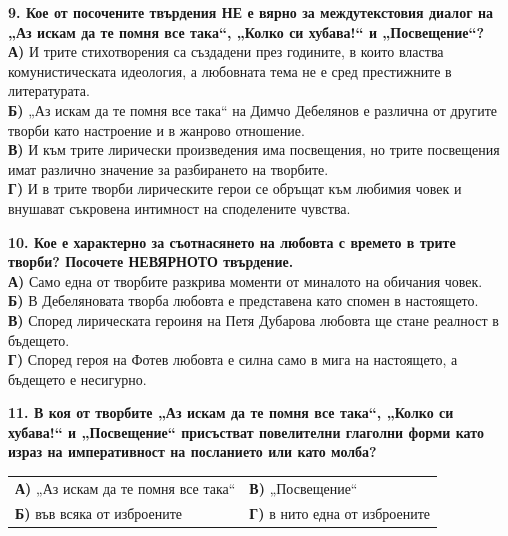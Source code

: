 \documentclass[12pt,a4paper]{article}
\begin{document}
\noindent
\textbf{9. Кое от посочените твърдения \textbf{НЕ} е вярно за междутекстовия диалог на „Аз искам да те помня все така“, „Колко си хубава!“ и „Посвещение“?} \\
\textbf{А)} И трите стихотворения са създадени през годините, в които властва комунистическата идеология, а любовната тема не е сред престижните в литературата. \\
\textbf{Б)} „Аз искам да те помня все така“ на Димчо Дебелянов е различна от другите творби като настроение и в жанрово отношение. \\
\textbf{В)} И към трите лирически произведения има посвещения, но трите посвещения имат различно значение за разбирането на творбите. \\
\textbf{Г)} И в трите творби лирическите герои се обръщат към любимия човек и внушават съкровена интимност на споделените чувства.

\vspace{0.6cm}

\noindent
\textbf{10. Кое е характерно за съотнасянето на любовта с времето в трите творби? Посочете \textbf{НЕВЯРНОТО} твърдение.} \\
\textbf{А)} Само една от творбите разкрива моменти от миналото на обичания човек. \\
\textbf{Б)} В Дебеляновата творба любовта е представена като спомен в настоящето. \\
\textbf{В)} Според лирическата героиня на Петя Дубарова любовта ще стане реалност в бъдещето. \\
\textbf{Г)} Според героя на Фотев любовта е силна само в мига на настоящето, а бъдещето е несигурно.

\vspace{0.6cm}

\noindent
\textbf{11. В коя от творбите „Аз искам да те помня все така“, „Колко си хубава!“ и „Посвещение“ присъстват повелителни глаголни форми като израз на императивност на посланието или като молба?} \\

\vspace{-0.1cm}

\noindent
\begin{tabular}{@{}p{} p{}@{}}
\textbf{А)} „Аз искам да те помня все така“ & \textbf{В)} „Посвещение“ \\
\textbf{Б)} във всяка от изброените & \textbf{Г)} в нито една от изброените
\end{tabular}
\end{document}
